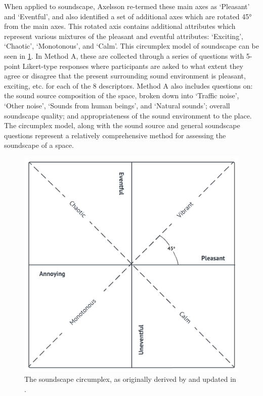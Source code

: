 When applied to soundscape, Axelsson re-termed these main axes as `Pleasant' and `Eventful', and also identified a set of additional axes which are rotated 45° from the main axes. This rotated axis contains additional attributes which represent various mixtures of the pleasant and eventful attributes: `Exciting', `Chaotic', `Monotonous', and `Calm'. This circumplex model of soundscape can be seen in \cref{fig:circumplexOnly}. In Method A, these  are collected through a series of questions with 5-point Likert-type responses where participants are asked to what extent they agree or disagree that the present surrounding sound environment is pleasant, exciting, etc. for each of the 8 descriptors. Method A also includes questions on: the sound source composition of the space, broken down into `Traffic noise', `Other noise', `Sounds from human beings', and `Natural sounds'; overall soundscape quality; and appropriateness of the sound environment to the place. The circumplex model, along with the sound source and general soundscape questions represent a relatively comprehensive method for assessing the soundscape of a space.

\begin{figure}
  \centering
  \includegraphics{Figures/CircumplexOnly.png}
  \caption{The soundscape circumplex, as originally derived by \citet{Axelsson2010principal} and updated in \citet{ISO12913Part2}. \label{fig:circumplexOnly}}
\end{figure}

